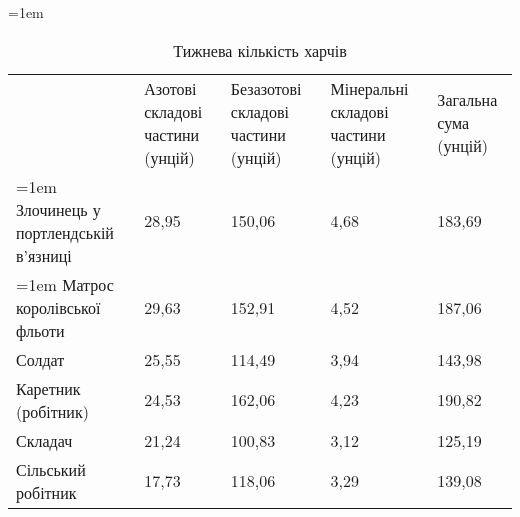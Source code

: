 \begin{table}
\caption*{Тижнева кількість харчів}
\newlength{\myheight}
\hangindent=1em
\setlength{\myheight}{10em}
\noindent\begin{tabularx}{\textwidth}{p{4cm}|Y Y Y Y}
  \toprule
  &
  Азотові  складові  частини (унцій) &
  \mbox{Безазотові}  складові  частини (унцій) &
  \mbox{Мінеральні}  складові  частини (унцій) &
  Загальна  сума (унцій) \\

  \parbox[b]{\hsize}{\hangindent=1em Злочинець у портлендській
в’язниці\dotfill{}}            & 28,95 & 150,06 & 4,68 & 183,69 \\
  \parbox[b]{\hsize}{\hangindent=1em Матрос королівської
фльоти\dotfill{}}        & 29,63 & 152,91 & 4,52 & 187,06  \\
  Солдат\dotfill{}          & 25,55 & 114,49 & 3,94 & 143,98\\
  Каретник (робітник)\dotfill{}  & 24,53 & 162,06 & 4,23 & 190,82\\
  Складач\dotfill{}          & 21,24 & 100,83 & 3,12 & 125,19\\
  Сільський робітник\dotfill{}  & 17,73 & 118,06 & 3,29 & 139,08 \\

\end{tabularx}
\end {table}
